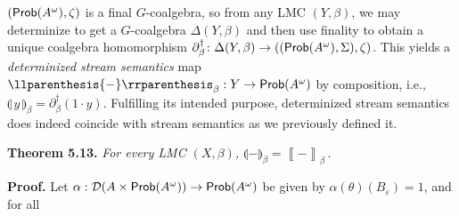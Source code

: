 \hypertarget{html:S5.SS0.SSS0.Px2.p5.m1}{}\({(\text{\sf Prob}(A^{\omega}),\zeta)}\) is a final %
\hypertarget{html:S5.SS0.SSS0.Px2.p5.m2}{}\({G}\)-coalgebra, so from any LMC %
\hypertarget{html:S5.SS0.SSS0.Px2.p5.m3}{}\({(Y,\beta)}\), we may determinize to get a %
\hypertarget{html:S5.SS0.SSS0.Px2.p5.m4}{}\({G}\)-coalgebra %
\hypertarget{html:S5.SS0.SSS0.Px2.p5.m5}{}\({\Delta(Y,\beta)}\) and then use finality to obtain a unique coalgebra homomorphism %
\hypertarget{html:S5.SS0.SSS0.Px2.p5.m6}{}\({\partial_{\beta}^{\dagger}\colon\Delta(Y,\beta)\to((\text{\sf Prob}(A^{\omega}),\Sigma),\zeta)}\). This yields a \emph{determinized stream semantics} map %
\hypertarget{html:S5.SS0.SSS0.Px2.p5.m7}{}\({\llparenthesis{-}\rrparenthesis_{\beta}:Y\to\text{\sf Prob}(A^{\omega})}\) by composition, i.e., %
\hypertarget{html:S5.SS0.SSS0.Px2.p5.m8}{}\({\llparenthesis{\,y\,}\rrparenthesis_{\beta}=\partial_{\beta}^{\dagger}(1\cdot y)}\). Fulfilling its intended purpose, determinized stream semantics does indeed coincide with stream semantics as we previously defined it.
\par\medskip
\hypertarget{html:S5.Thmtheorem13}{} \par\noindent\textbf{\textbf{Theorem 5.13}\textbf{.}}\quad  %
\hypertarget{html:S5.Thmtheorem13.p1}{} \emph{For every LMC %
\hypertarget{html:S5.Thmtheorem13.p1.m1}{}\({(X,\beta)}\), %
\hypertarget{html:S5.Thmtheorem13.p1.m2}{}\({\llparenthesis{-}\rrparenthesis_{\beta}=\left\llbracket{-}\right\rrbracket_{\beta}\,.}\)}
\par\medskip
\hypertarget{html:S5.SS0.SSS0.Px2.SPx1}{} \par\noindent\textbf{Proof.}\quad  %
\hypertarget{html:S5.SS0.SSS0.Px2.SPx1.p1}{} Let %
\hypertarget{html:S5.SS0.SSS0.Px2.SPx1.p1.m1}{}\({\alpha:{\mathcal{D}}(A\times\text{\sf Prob}(A^{\omega}))\to\text{\sf Prob}(A^{\omega})}\) be given by %
\hypertarget{html:S5.SS0.SSS0.Px2.SPx1.p1.m2}{}\({\alpha(\theta)(B_{\varepsilon})=1}\), and for all %
